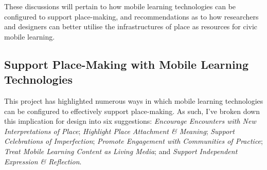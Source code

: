 These discussions will pertain to how mobile learning technologies can be configured to support place-making, and recommendations as to how researchers and designers can better utilise the infrastructures of place as resources for civic mobile learning.

\subsection{Support Place-Making with Mobile Learning Technologies}

This project has highlighted numerous ways in which mobile learning technologies can be configured to effectively support place-making. As such, I've broken down this implication for design into six suggestions: \textit{Encourage Encounters with New Interpretations of Place}; \textit{Highlight Place Attachment \& Meaning}; \textit{Support Celebrations of Imperfection}; \textit{Promote Engagement with Communities of Practice}; \textit{Treat Mobile Learning Content as Living Media}; and \textit{Support Independent Expression \& Reflection}.

